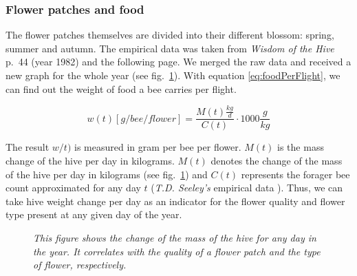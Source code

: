 		\subsubsection{Flower patches and food}
			The flower patches themselves are divided into their different blossom: spring, summer and autumn. The empirical data was taken from \textit{Wisdom of the Hive} p.~44 (year 1982) and the following page. We merged the raw data and received a new graph for the whole year (see fig.~\ref{fig:seasonalFlowers}). With equation \ref{eq:foodPerFlight}, we can find out the weight of food a bee carries per flight. 
			
			\begin{equation}\label{eq:foodPerFlight}
						w(t) [g/bee/flower] = \frac{M(t) \frac{kg}{d}}{C(t)}\cdot 1000 \frac{g}{kg}
			\end{equation}
			
			The result $w/t)$ is measured in gram per bee per flower. $M(t)$ is the mass change of the hive per day in kilograms.
			$M(t)$ denotes the change of the mass of the hive per day in kilograms (see fig.~\ref{fig:seasonalFlowers}) and $C(t)$ represents the forager bee count approximated for any day $t$ (\textit{T.D. Seeley's} empirical data \cite{seeley95}). Thus, we can take hive weight change per day as an indicator for the flower quality and flower type present at any given day of the year. 
			
			
				\begin{figure}
						\centering
						\caption{\textit{This figure shows the change of the mass of the hive for any day in the year. It correlates with the quality of a flower patch and the type of flower, respectively.}}
					\label{fig:seasonalFlowers}
					\end{figure}
	
